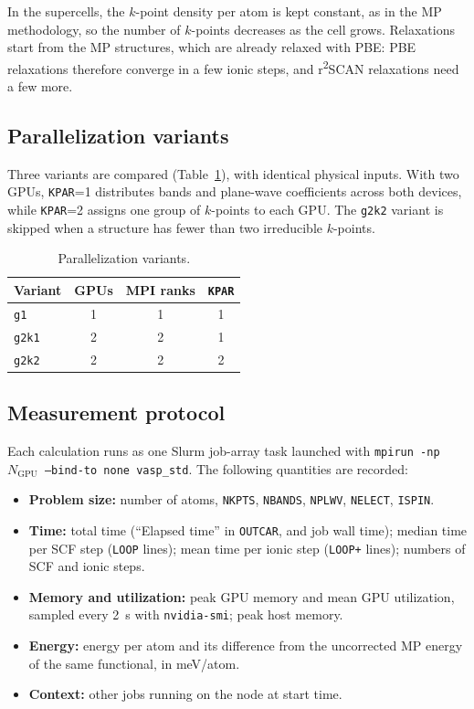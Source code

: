 \documentclass[11pt,letterpaper]{article}
\begin{document}
In the supercells, the $k$-point density per atom is kept constant, as in the MP methodology,
so the number of $k$-points decreases as the cell grows. Relaxations start from the MP
structures, which are already relaxed with PBE: PBE relaxations therefore converge in a few
ionic steps, and r\textsuperscript{2}SCAN relaxations need a few more.

\subsection{Parallelization variants}
\label{sec:variants}

Three variants are compared (Table~\ref{tab:variants}), with identical physical inputs. With two
GPUs, \texttt{KPAR}=1 distributes bands and plane-wave coefficients across both devices, while
\texttt{KPAR}=2 assigns one group of $k$-points to each GPU. The \texttt{g2k2} variant is
skipped when a structure has fewer than two irreducible $k$-points.

\begin{table}[htbp]
\centering
\caption{Parallelization variants.}
\label{tab:variants}
\begin{tabular}{@{}lccc@{}}
\toprule
Variant & GPUs & MPI ranks & \texttt{KPAR} \\
\midrule
\texttt{g1} & 1 & 1 & 1 \\
\texttt{g2k1} & 2 & 2 & 1 \\
\texttt{g2k2} & 2 & 2 & 2 \\
\bottomrule
\end{tabular}
\end{table}

\subsection{Measurement protocol}
\label{sec:metrics}

Each calculation runs as one Slurm job-array task launched with
\texttt{mpirun -np $N_\text{GPU}$ --bind-to none vasp\_std}. The following quantities are
recorded:
\begin{itemize}
  \item \textbf{Problem size:} number of atoms, \texttt{NKPTS}, \texttt{NBANDS}, \texttt{NPLWV},
        \texttt{NELECT}, \texttt{ISPIN}.
  \item \textbf{Time:} total time (``Elapsed time'' in \texttt{OUTCAR}, and job wall time);
        median time per SCF step (\texttt{LOOP} lines); mean time per ionic step
        (\texttt{LOOP+} lines); numbers of SCF and ionic steps.
  \item \textbf{Memory and utilization:} peak GPU memory and mean GPU utilization, sampled
        every \SI{2}{s} with \texttt{nvidia-smi}; peak host memory.
  \item \textbf{Energy:} energy per atom and its difference from the uncorrected MP energy of
        the same functional, in meV/atom.
  \item \textbf{Context:} other jobs running on the node at start time.
\end{itemize}
\end{document}

